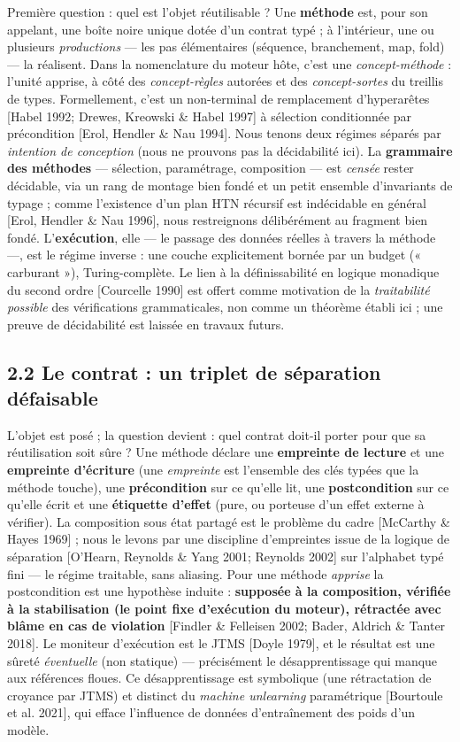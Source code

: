 \documentclass[11pt]{article}
\begin{document}
Première question : quel est l'objet réutilisable ? Une \textbf{méthode} est, pour son appelant, une boîte noire unique dotée d'un contrat typé ; à l'intérieur, une ou plusieurs \emph{productions} — les pas élémentaires (séquence, branchement, map, fold) — la réalisent. Dans la nomenclature du moteur hôte, c'est une \emph{concept-méthode} : l'unité apprise, à côté des \emph{concept-règles} autorées et des \emph{concept-sortes} du treillis de types. Formellement, c'est un non-terminal de remplacement d'hyperarêtes [Habel 1992; Drewes, Kreowski \& Habel 1997] à sélection conditionnée par précondition [Erol, Hendler \& Nau 1994]. Nous tenons deux régimes séparés par \emph{intention de conception} (nous ne prouvons pas la décidabilité ici). La \textbf{grammaire des méthodes} — sélection, paramétrage, composition — est \emph{censée} rester décidable, via un rang de montage bien fondé et un petit ensemble d'invariants de typage ; comme l'existence d'un plan HTN récursif est indécidable en général [Erol, Hendler \& Nau 1996], nous restreignons délibérément au fragment bien fondé. L'\textbf{exécution}, elle — le passage des données réelles à travers la méthode —, est le régime inverse : une couche explicitement bornée par un budget (« carburant »), Turing-complète. Le lien à la définissabilité en logique monadique du second ordre [Courcelle 1990] est offert comme motivation de la \emph{traitabilité possible} des vérifications grammaticales, non comme un théorème établi ici ; une preuve de décidabilité est laissée en travaux futurs.

\subsection*{2.2 Le contrat : un triplet de séparation défaisable}

L'objet est posé ; la question devient : quel contrat doit-il porter pour que sa réutilisation soit sûre ? Une méthode déclare une \textbf{empreinte de lecture} et une \textbf{empreinte d'écriture} (une \emph{empreinte} est l'ensemble des clés typées que la méthode touche), une \textbf{précondition} sur ce qu'elle lit, une \textbf{postcondition} sur ce qu'elle écrit et une \textbf{étiquette d'effet} (pure, ou porteuse d'un effet externe à vérifier). La composition sous état partagé est le problème du cadre [McCarthy \& Hayes 1969] ; nous le levons par une discipline d'empreintes issue de la logique de séparation [O'Hearn, Reynolds \& Yang 2001; Reynolds 2002] sur l'alphabet typé fini — le régime traitable, sans aliasing. Pour une méthode \emph{apprise} la postcondition est une hypothèse induite : \textbf{supposée à la composition, vérifiée à la stabilisation (le point fixe d'exécution du moteur), rétractée avec blâme en cas de violation} [Findler \& Felleisen 2002; Bader, Aldrich \& Tanter 2018]. Le moniteur d'exécution est le JTMS [Doyle 1979], et le résultat est une sûreté \emph{éventuelle} (non statique) — précisément le désapprentissage qui manque aux références floues. Ce désapprentissage est symbolique (une rétractation de croyance par JTMS) et distinct du \emph{machine unlearning} paramétrique [Bourtoule et al. 2021], qui efface l'influence de données d'entraînement des poids d'un modèle.
\end{document}
